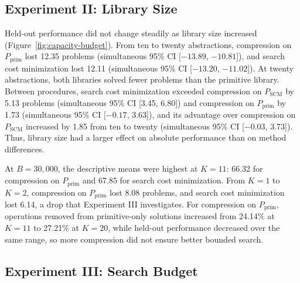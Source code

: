 \documentclass[10pt]{article}
\begin{document}
\subsection{Experiment II: Library Size}

Held-out performance did not change steadily as library
size increased
(Figure~\ref{fig:capacity-budget}). From ten to twenty abstractions,
compression on $P_{\mathrm{prim}}$ lost 12.35 problems
(simultaneous 95\% CI [$-13.89$, $-10.81$]), and search cost minimization
lost 12.11 (simultaneous 95\% CI [$-13.20$, $-11.02$]). At twenty
abstractions, both libraries solved fewer problems than the primitive
library. Between procedures, search cost minimization exceeded compression
on $P_{\mathrm{SCM}}$ by 5.13 problems (simultaneous 95\% CI [3.45,
6.80]) and compression on $P_{\mathrm{prim}}$ by 1.73 (simultaneous 95\%
CI [$-0.17$, 3.63]), and its advantage over compression on
$P_{\mathrm{SCM}}$ increased by 1.85 from ten to twenty (simultaneous
95\% CI [$-0.03$, 3.73]). Thus, library size had a larger effect on
absolute performance than on method differences.

At $B=30{,}000$, the descriptive means were highest at $K=11$: 66.32 for
compression on $P_{\mathrm{prim}}$ and 67.85 for search cost
minimization. From $K=1$ to $K=2$, compression on $P_{\mathrm{prim}}$
lost 8.08 problems, and search cost minimization lost 6.14, a drop that
Experiment III investigates. For compression on $P_{\mathrm{prim}}$,
operations removed from primitive-only solutions increased from 24.14\% at
$K=11$ to 27.21\% at $K=20$, while held-out performance decreased over the
same range, so more compression did not ensure better bounded search.
\subsection{Experiment III: Search Budget}
\end{document}
